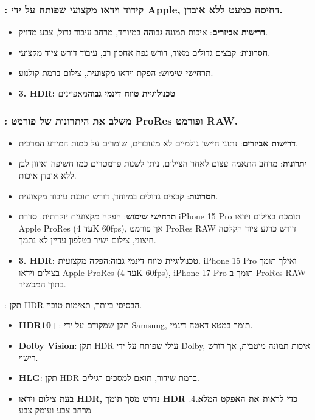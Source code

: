 \subsubsection*{: קידוד וידאו מקצועי שפותח על ידי Apple, דחיסה כמעט ללא אובדן.}

\begin{itemize}
  \item \textbf{דרישות אביזרים}: איכות תמונה גבוהה במיוחד, מרחב עיבוד גדול, צבע מדויק.
  \item \textbf{חסרונות}: קבצים גדולים מאוד, דורש נפח אחסון רב, עיבוד דורש ציוד מקצועי.
  \item \textbf{תרחישי שימוש}: הפקת וידאו מקצועית, צילום ברמת קולנוע.
  \item \textbf{3. HDR: טכנולוגיית טווח דינמי גבוה}מאפיינים
\end{itemize}

\subsubsection*{: משלב את היתרונות של פורמט ProRes ופורמט RAW.}

\begin{itemize}
  \item \textbf{דרישות אביזרים}: נתוני חיישן גולמיים לא מעובדים, שומרים על כמות המידע המרבית.
  \item \textbf{יתרונות}: מרחב התאמה עצום לאחר הצילום, ניתן לשנות פרמטרים כמו חשיפה ואיזון לבן ללא אובדן איכות.
  \item \textbf{חסרונות}: קבצים גדולים במיוחד, דורש תוכנת עיבוד מקצועית.
  \item \textbf{תרחישי שימוש}: הפקה מקצועית יוקרתית. סדרת iPhone 15 Pro תומכת בצילום וידאו Apple ProRes (עד 4K 60fps), אך פורמט ProRes RAW דורש כרגע ציוד הקלטה חיצוני, צילום ישיר בטלפון עדיין לא נתמך.
  \item \textbf{3. HDR: טכנולוגיית טווח דינמי גבוה}:הפקה מקצועית. iPhone 15 Pro ואילך תומך בצילום וידאו Apple ProRes (עד 4K 60fps), iPhone 17 Pro תומך ב-ProRes RAW בתוך המכשיר.
\end{itemize}


: תקן HDR הבסיסי ביותר, תאימות טובה.

\begin{itemize}
  \item \textbf{HDR10+}: תקן שמקודם על ידי Samsung, תומך במטא-דאטה דינמי.
  \item \textbf{Dolby Vision}: תקן HDR עילי שפותח על ידי Dolby, איכות תמונה מיטבית, אך דורש רישוי.
  \item \textbf{HLG}: תקן HDR ברמת שידור, תואם למסכים רגילים.
  \item \textbf{בעת צילום וידאו HDR, נדרש מסך תומך HDR כדי לראות את האפקט המלא.}4. מרחב צבע ועומק צבע
\end{itemize}

